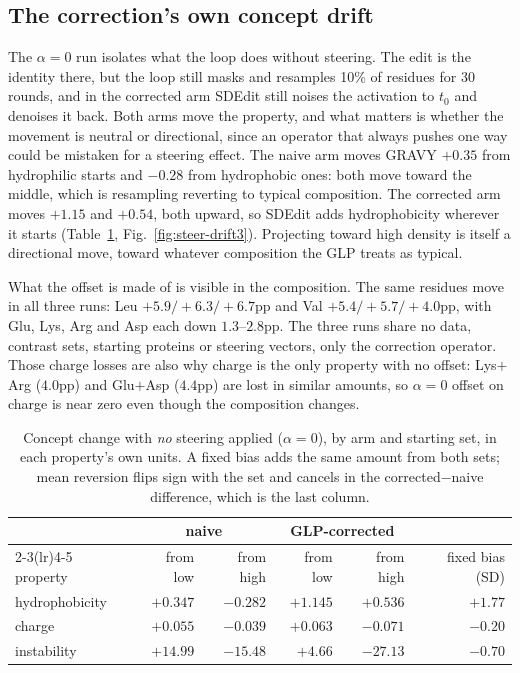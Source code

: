 \documentclass{article}
\begin{document}
\subsection{The correction's own concept drift}
\label{app:steer-drift}

The $\alpha{=}0$ run isolates what the loop does without steering. The edit is the identity
there, but the loop still masks and resamples 10\% of residues for 30 rounds, and in the
corrected arm SDEdit still noises the activation to $t_0$ and denoises it back. Both arms move
the property, and what matters is whether the movement is neutral or directional, since an
operator that always pushes one way could be mistaken for a steering effect. The naive arm moves GRAVY $+0.35$ from hydrophilic starts and $-0.28$ from
hydrophobic ones: both move toward the middle, which is resampling reverting to typical
composition. The corrected arm moves $+1.15$ and $+0.54$, both upward, so SDEdit adds
hydrophobicity wherever it starts (Table~\ref{tab:steer-drift}, Fig.~\ref{fig:steer-drift3}). Projecting toward high density is itself a directional move,
toward whatever composition the GLP treats as typical.

\newpage
What the offset is made of is visible in the composition. The same residues move in all three
runs: Leu $+5.9/+6.3/+6.7$pp and Val $+5.4/+5.7/+4.0$pp, with Glu, Lys, Arg and Asp each down
$1.3$--$2.8$pp. The three runs share no data, contrast sets, starting proteins or steering
vectors, only the correction operator. Those
charge losses are also why charge is the only property with no offset: Lys$+$Arg ($4.0$pp) and
Glu$+$Asp ($4.4$pp) are lost in similar amounts, so $\alpha{=}0$ offset on charge is near zero even though the composition changes.

\begin{table}[H]
\centering
\caption{Concept change with \emph{no} steering applied ($\alpha{=}0$), by arm and starting
set, in each property's own units. A fixed bias adds the same amount from both sets; mean
reversion flips sign with the set and cancels in the corrected$-$naive difference, which is
the last column.}
\label{tab:steer-drift}
\begin{tabular}{lrrrrr}
\toprule
& \multicolumn{2}{c}{naive} & \multicolumn{2}{c}{GLP-corrected} & \\
\cmidrule(lr){2-3}\cmidrule(lr){4-5}
property & from low & from high & from low & from high & fixed bias (SD) \\
\midrule
hydrophobicity & $+0.347$ & $-0.282$ & $+1.145$ & $+0.536$ & $+1.77$ \\
charge         & $+0.055$ & $-0.039$ & $+0.063$ & $-0.071$ & $-0.20$ \\
instability    & $+14.99$ & $-15.48$ & $+4.66$  & $-27.13$ & $-0.70$ \\
\bottomrule
\end{tabular}
\end{table}
\end{document}
